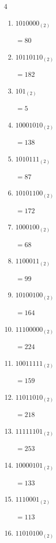 \begin{multicols}{4}
\begin{enumerate}
        $=230$

  \item $1010000_{(2)}$

        $=80$

  \item $10110110_{(2)}$

        $=182$

  \item $101_{(2)}$

        $=5$

  \item $10001010_{(2)}$

        $=138$

  \item $1010111_{(2)}$

        $=87$

  \item $10101100_{(2)}$

        $=172$

  \item $1000100_{(2)}$

        $=68$

  \item $1100011_{(2)}$

        $=99$

  \item $10100100_{(2)}$

        $=164$

  \item $11100000_{(2)}$

        $=224$

  \item $10011111_{(2)}$

        $=159$

  \item $11011010_{(2)}$

        $=218$

  \item $11111101_{(2)}$

        $=253$

  \item $10000101_{(2)}$

        $=133$

\columnbreak %

  \item $1110001_{(2)}$

        $=113$

  \item $11010100_{(2)}$


\end{enumerate}
\end{multicols}
